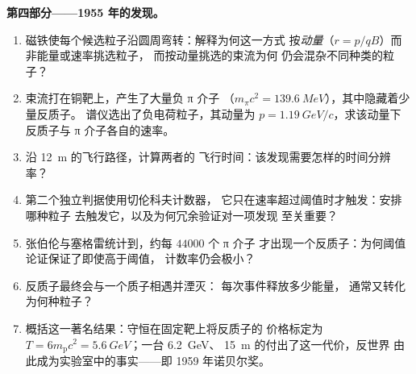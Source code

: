 \begin{problem}
\medskip\noindent\textbf{第四部分——1955 年的发现。}
\begin{enumerate}[resume]
  \item 磁铁使每个候选粒子沿圆周弯转：解释为何这一方式
        按\emph{动量}（$r = p/qB$）而非能量或速率挑选粒子，
        而按动量挑选的束流为何
        仍会混杂不同种类的粒子？
  \item 束流打在铜靶上，产生了大量负 π 介子
        （$m_\pi c^2 = \qty{139.6}{MeV}$），其中隐藏着少量反质子。
        谱仪选出了负电荷粒子，其动量为
        $p = \qty{1.19}{GeV}/c$，求该动量下
        反质子与 π 介子各自的速率。
  \item 沿 \qty{12}{m} 的飞行路径，计算两者的
        飞行时间：该发现需要怎样的时间分辨率？
  \item 第二个独立判据使用切伦科夫计数器，
        它只在速率超过阈值时才触发：安排哪种粒子
        去触发它，以及为何冗余验证对一项发现
        至关重要？
  \item 张伯伦与塞格雷统计到，约每 $\num{44000}$ 个 π 介子
        才出现一个反质子：为何阈值论证保证了即使高于阈值，
        计数率仍会极小？
  \item 反质子最终会与一个质子相遇并湮灭：
        每次事件释放多少能量，
        通常又转化为何种粒子？
  \item 概括这一著名结果：守恒在固定靶上将反质子的
        价格标定为 $T = 6m_{\text{p}}c^2 =
        \qty{5.6}{GeV}$；一台 \qty{6.2}{GeV}、
        \qty{15}{m} 的付出了这一代价，反世界
        由此成为实验室中的事实——即 1959 年诺贝尔奖。
\end{enumerate}
\end{problem}
